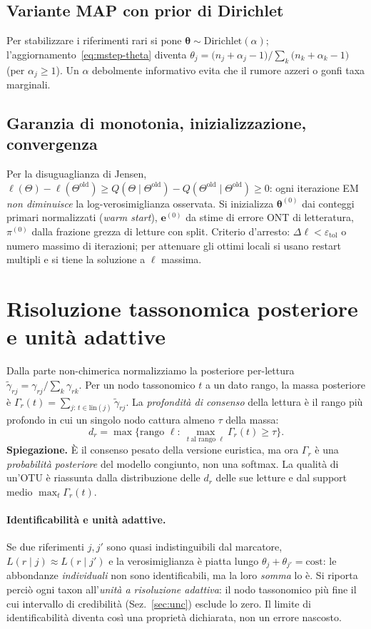 \documentclass[11pt,a4paper]{article}
\newcommand{\bt}{\boldsymbol{\theta}}
\newcommand{\bpi}{\pi}
\newcommand{\ee}{\mathbf{e}}
\newcommand{\lin}{\mathrm{lin}}
\begin{document}
\subsection{Variante MAP con prior di Dirichlet}
Per stabilizzare i riferimenti rari si pone $\bt\sim\text{Dirichlet}(\alpha)$; l'aggiornamento~\eqref{eq:mstep-theta} diventa $\theta_j=\big(n_j+\alpha_j-1\big)/\sum_k\big(n_k+\alpha_k-1\big)$ (per $\alpha_j\ge1$). Un $\alpha$ debolmente informativo evita che il rumore azzeri o gonfi taxa marginali.

\subsection{Garanzia di monotonia, inizializzazione, convergenza}
Per la disuguaglianza di Jensen, $\ell(\Theta)-\ell(\Theta^{\text{old}})\ge Q(\Theta\mid\Theta^{\text{old}})-Q(\Theta^{\text{old}}\mid\Theta^{\text{old}})\ge0$: ogni iterazione EM \emph{non diminuisce} la log-verosimiglianza osservata. Si inizializza $\bt^{(0)}$ dai conteggi primari normalizzati (\emph{warm start}), $\ee^{(0)}$ da stime di errore ONT di letteratura, $\bpi^{(0)}$ dalla frazione grezza di letture con split. Criterio d'arresto: $\Delta\ell<\varepsilon_{\mathrm{tol}}$ o numero massimo di iterazioni; per attenuare gli ottimi locali si usano restart multipli e si tiene la soluzione a $\ell$ massima.

\section{Risoluzione tassonomica posteriore e unit\`a adattive}
Dalla parte non-chimerica normalizziamo la posteriore per-lettura $\tilde\gamma_{rj}=\gamma_{rj}/\sum_{k}\gamma_{rk}$. Per un nodo tassonomico $t$ a un dato rango, la massa posteriore \`e $\Gamma_r(t)=\sum_{j:\,t\in\lin(j)}\tilde\gamma_{rj}$. La \emph{profondit\`a di consenso} della lettura \`e il rango pi\`u profondo in cui un singolo nodo cattura almeno $\tau$ della massa:
\begin{equation}
d_r=\max\Big\{\text{rango }\ell:\ \max_{t\ \text{al rango }\ell}\Gamma_r(t)\ge\tau\Big\}.
\end{equation}
\textbf{Spiegazione.} \`E il consenso pesato della versione euristica, ma ora $\Gamma_r$ \`e una \emph{probabilit\`a posteriore} del modello congiunto, non una softmax. La qualit\`a di un'OTU \`e riassunta dalla distribuzione delle $d_r$ delle sue letture e dal support medio $\max_t\Gamma_r(t)$.

\paragraph{Identificabilit\`a e unit\`a adattive.} Se due riferimenti $j,j'$ sono quasi indistinguibili dal marcatore, $L(r\mid j)\approx L(r\mid j')$ e la verosimiglianza \`e piatta lungo $\theta_j+\theta_{j'}=\text{cost}$: le abbondanze \emph{individuali} non sono identificabili, ma la loro \emph{somma} lo \`e. Si riporta perci\`o ogni taxon all'\emph{unit\`a a risoluzione adattiva}: il nodo tassonomico pi\`u fine il cui intervallo di credibilit\`a (Sez.~\ref{sec:unc}) esclude lo zero. Il limite di identificabilit\`a diventa cos\`i una propriet\`a dichiarata, non un errore nascosto.
\end{document}
